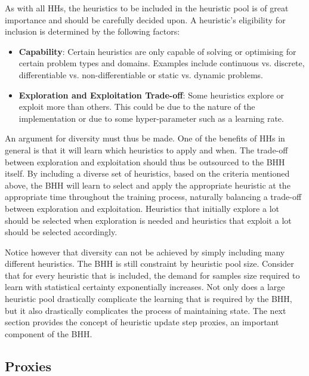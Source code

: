As with all \acp{HH}, the heuristics to be included in the heuristic pool is of great importance and should be carefully decided upon. A heuristic's eligibility for inclusion is determined by the following factors:

\begin{itemize}
      \item \textbf{Capability}: Certain heuristics are only capable of solving or optimising for certain problem types and domains. Examples include continuous vs. discrete, differentiable vs.  non-differentiable or static vs. dynamic problems.

      \item \textbf{Exploration and Exploitation Trade-off}: Some heuristics explore or exploit more than others. This could be due to the nature of the implementation or due to some hyper-parameter such as a learning rate.
\end{itemize}

An argument for diversity must thus be made. One of the benefits of \acp{HH} in general is that it will learn which heuristics to apply and when. The trade-off between exploration and exploitation should thus be outsourced to the \ac{BHH} itself. By including a diverse set of heuristics, based on the criteria mentioned above, the \ac{BHH} will learn to select and apply the appropriate heuristic at the appropriate time throughout the training process, naturally balancing a trade-off between exploration and exploitation. Heuristics that initially explore a lot should be selected when exploration is needed and heuristics that exploit a lot should be selected accordingly.

Notice however that diversity can not be achieved by simply including many different heuristics. The \ac{BHH} is still constraint by heuristic pool size. Consider that for every heuristic that is included, the demand for samples size required to learn with statistical certainty exponentially increases. Not only does a large heuristic pool drastically complicate the learning that is required by the \ac{BHH}, but it also drastically complicates the process of maintaining state. The next section provides the concept of heuristic update step proxies, an important component of the \ac{BHH}.

\subsection{Proxies}
\label{sec:bhh:heuristic:proxies}

